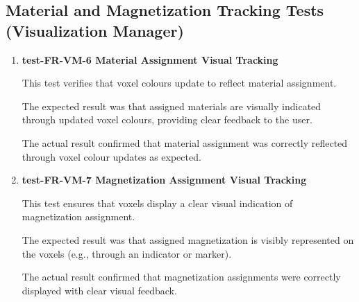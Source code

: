 \documentclass[12pt, titlepage]{article}
\begin{document}
\subsection{Material and Magnetization Tracking Tests (Visualization Manager)}

\begin{enumerate}


\item \textbf{test-FR-VM-6 Material Assignment Visual Tracking}

\hspace{1.5em} This test verifies that voxel colours update to reflect material assignment.

The expected result was that assigned materials are visually indicated through updated voxel colours, providing clear feedback to the user.

The actual result confirmed that material assignment was correctly reflected through voxel colour updates as expected.



\item \textbf{test-FR-VM-7 Magnetization Assignment Visual Tracking}

\hspace{1.5em} This test ensures that voxels display a clear visual indication of magnetization assignment.

The expected result was that assigned magnetization is visibly represented on the voxels (e.g., through an indicator or marker).

The actual result confirmed that magnetization assignments were correctly displayed with clear visual feedback.
\end{enumerate}
\end{document}
